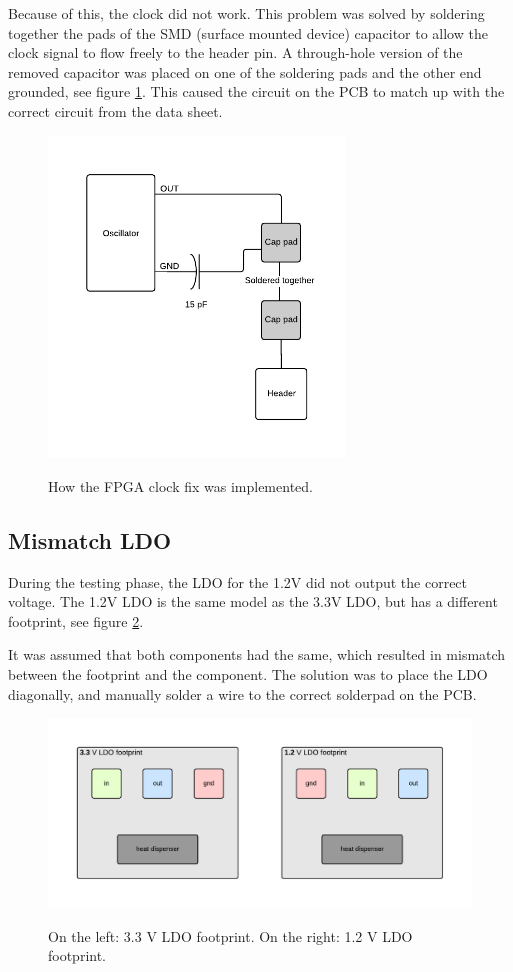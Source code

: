 \documentclass[../main/report.tex]{subfiles}
\begin{document}
Because of this, the clock did not work.
This problem was solved by soldering together the pads of the SMD (surface mounted device) capacitor to allow the clock signal to flow freely to the header pin.
A through-hole version of the removed capacitor was placed on one of the soldering pads and the other end grounded, see figure \ref{fig:pcb-clock-fix}.
This caused the circuit on the PCB to match up with the correct circuit from the data sheet.

\begin{figure}[H]
    \centering
    \includegraphics[width=0.7\textwidth]{../pcb/assets/pcb-clock-fix.pdf}
    \label{fig:pcb-clock-fix}
    \caption{How the FPGA clock fix was implemented.}
\end{figure}

\subsection{Mismatch LDO}
During the testing phase, the LDO for the 1.2V did not output the correct voltage.
The 1.2V LDO is the same model as the 3.3V LDO, but has a different
footprint, see figure \ref{fig:ldo-footprints}.

It was assumed that both components had the same, which resulted in mismatch between the footprint and the component.
The solution was to place the LDO diagonally,  and manually solder a wire to the correct solderpad on the PCB. 

\begin{figure}[H]
    \centering
    \includegraphics[width=\textwidth]{../pcb/assets/ldo-footprints.pdf}
    \label{fig:ldo-footprints}
    \caption{On the left: 3.3 V LDO footprint. On the right: 1.2 V LDO footprint.}
\end{figure}
\end{document}
